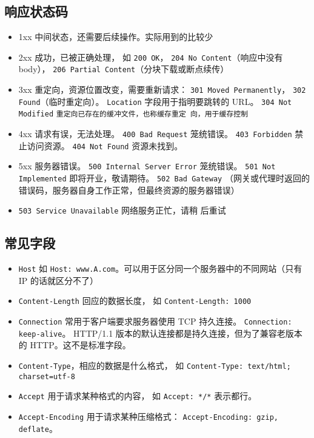 \subsection{响应状态码}
\begin{itemize}
\item 1xx 中间状态，还需要后续操作。实际用到的比较少
\item 2xx 成功，已被正确处理， 如 \verb`200 OK`， \verb`204 No Content`（响应中没有 body）， \verb`206 Partial Content`（分块下载或断点续传）
\item 3xx 重定向，资源位置改变，需要重新请求： \verb`301 Moved Permanently`， \verb`302 Found`（临时重定向）。 \verb`Location` 字段用于指明要跳转的 URL。 \verb`304 Not Modified` \verb`重定向已存在的缓冲文件，也称缓存重定 向，用于缓存控制`
\item 4xx 请求有误，无法处理。 \verb`400 Bad Request` 笼统错误。 \verb`403 Forbidden` 禁止访问资源。 \verb`404 Not Found` 资源未找到。
\item 5xx 服务器错误。 \verb`500 Internal Server Error` 笼统错误。 \verb`501 Not Implemented` 即将开业，敬请期待。 \verb`502 Bad Gateway` （网关或代理时返回的错误码，服务器自身工作正常，但最终资源的服务器错误）
\item \verb`503 Service Unavailable` 网络服务正忙，请稍 后重试
\end{itemize}

\subsection{常见字段}
\begin{itemize}
\item \verb`Host` 如 \verb`Host: www.A.com`。可以用于区分同一个服务器中的不同网站（只有 IP 的话就区分不了）
\item \verb`Content-Length` 回应的数据长度， 如 \verb`Content-Length: 1000`
\item \verb`Connection` 常用于客户端要求服务器使用 TCP 持久连接。 \verb`Connection: keep-alive`。 HTTP/1.1 版本的默认连接都是持久连接，但为了兼容老版本的 HTTP。这不是标准字段。
\item \verb`Content-Type`，相应的数据是什么格式， 如 \verb`Content-Type: text/html; charset=utf-8`
\item \verb`Accept` 用于请求某种格式的内容， 如 \verb`Accept: */*` 表示都行。
\item \verb`Accept-Encoding` 用于请求某种压缩格式： \verb`Accept-Encoding: gzip, deflate`。
\end{itemize}
